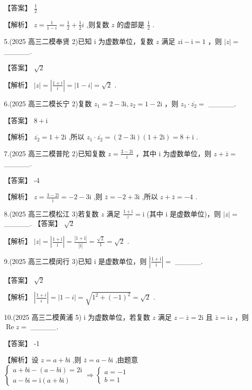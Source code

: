 \documentclass[10pt]{article}
\begin{document}
【答案】 \(\frac{1}{2}\)

【解析】 \(z = \frac{1}{1 - i} = \frac{1}{2} + \frac{1}{2}i\) ,则复数 \(z\) 的虚部是 \(\frac{1}{2}\) .

5.(2025 高三二模奉贤 2)已知 \(\mathrm{i}\) 为虚数单位，复数 \(z\) 满足 \(z\mathrm{i} - \mathrm{i} = 1\) ，则 \(\left| z\right|  =\) \_\_\_\_\_.

【答案】 \(\sqrt{2}\)

【解析】 \(\left| z\right|  = \left| \frac{1 + i}{i}\right|  = \left| {1 - i}\right|  = \sqrt{2}\) .

6.(2025 高三二模长宁 2)复数 \({z}_{1} = 2 - {3\mathrm{i}},{z}_{2} = 1 - {2\mathrm{i}}\) ，则 \({z}_{1} \cdot  \overline{{z}_{2}} =\) \_\_\_\_\_.

【答案】 \(8 + \mathrm{i}\)

【解析】 \(\overline{{z}_{2}} = 1 + 2\mathrm{i}\) ,所以 \({z}_{1} \cdot  \overline{{z}_{2}} = \left( {2 - 3\mathrm{i}}\right) \left( {1 + 2\mathrm{i}}\right)  = 8 + \mathrm{i}\) .

7.(2025 高三二模普陀 2)已知复数 \(z = \frac{3 - {2\mathrm{i}}}{\mathrm{i}}\) ，其中 \(\mathrm{i}\) 为虚数单位，则 \(z + \bar{z} =\) \_\_\_\_\_.

【答案】 -4

【解析】 \(z = \frac{3 - 2\mathrm{i}}{\mathrm{i}} =  - 2 - 3\mathrm{i}\) ,则 \(\bar{z} =  - 2 + 3\mathrm{i}\) ,所以 \(z + \bar{z} =  - 4\) .

8.(2025 高三二模松江 3)若复数 \(z\) 满足 \(\frac{1 + \mathrm{i}}{z} = \mathrm{i}\) (其中 \(\mathrm{i}\) 是虚数单位)，则 \(\left| z\right|  =\) \_\_\_\_\_. 【答案】 \(\sqrt{2}\)

【解析】 \(\left| z\right|  = \left| \frac{1 + \mathrm{i}}{\mathrm{i}}\right|  = \frac{\left| 1 + \mathrm{i}\right| }{\left| \mathrm{i}\right| } = \frac{\sqrt{2}}{1} = \sqrt{2}\) .

9.(2025 高三二模闵行 3)已知 \(\mathrm{i}\) 是虚数单位，则 \(\left| \frac{1 + \mathrm{i}}{\mathrm{i}}\right|  =\) \_\_\_\_\_.

【答案】 \(\sqrt{2}\)

【解析】 \(\left| \frac{1 + i}{i}\right|  = \left| {1 - i}\right|  = \sqrt{{1}^{2} + {\left( -1\right) }^{2}} = \sqrt{2}\) .

10.(2025 高三二模黄浦 5) \(\mathrm{i}\) 为虚数单位，若复数 \(z\) 满足 \(z - \bar{z} = {2\mathrm{i}}\) 且 \(\bar{z} = \mathrm{i}z\) ，则 \(\operatorname{Re}z =\) \_\_\_\_\_.

【答案】 -1

【解析】设 \(z = a + b\mathrm{i}\) ,则 \(\bar{z} = a - b\mathrm{i}\) ,由题意 \(\left\{  {\begin{array}{l} a + b\mathrm{i} - \left( {a - b\mathrm{i}}\right)  = 2\mathrm{i} \\  a - b\mathrm{i} = \mathrm{i}\left( {a + b\mathrm{i}}\right)  \end{array} \Rightarrow  \left\{  \begin{array}{l} a =  - 1 \\  b = 1 \end{array}\right. }\right.\)
\end{document}
